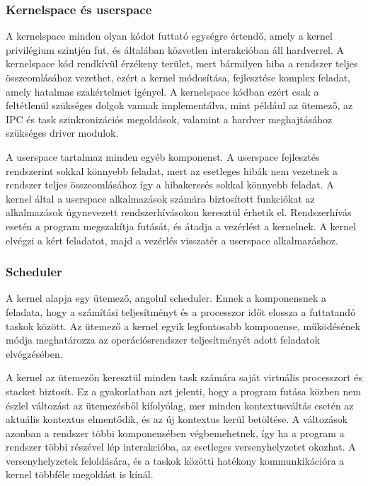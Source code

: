 \subsubsection{Kernelspace és userspace}

A kernelspace minden olyan kódot futtató egységre értendő, amely a
kernel privilégium szintjén fut, és általában közvetlen interakcióban áll
hardverrel. A kernelspace kód rendkívül érzékeny terület, mert bármilyen hiba a
rendszer teljes összeomlásához vezethet, ezért a kernel módosítása, fejlesztése
komplex feladat, amely hatalmas szakértelmet igényel. A kernelspace kódban ezért
csak a feltétlenül szükséges dolgok vannak implementálva, mint például az
ütemező, az IPC és task szinkronizációs megoldások, valamint a hardver
meghajtásához szükséges driver modulok. 

A userspace tartalmaz minden egyéb komponenst. A userspace fejlesztés rendszerint
sokkal könnyebb feladat, mert az esetleges hibák nem vezetnek a rendszer teljes
összeomlásához így a hibakeresés sokkal könnyebb feladat. A kernel által a
userspace alkalmazások számára biztosított funkciókat az alkalmazások
úgynevezett rendszerhívásokon keresztül érhetik el. Rendszerhívás esetén a
program megszakítja futását, és átadja a vezérlést a kernelnek. A kernel elvégzi
a kért feladatot, majd a vezérlés visszatér a userspace alkalmazáshoz.

\subsubsection{Scheduler}

A kernel alapja egy ütemező, angolul scheduler. Ennek a komponensnek a feladata,
hogy a számítási teljesítményt és a processzor időt elossza a futtatandó taskok
között. Az ütemező a kernel egyik legfontosabb komponense, működésének módja
meghatározza az operációsrendszer teljesítményét adott feladatok elvégzésében.

\medskip

A kernel az ütemezőn keresztül minden task számára saját virtuális processzort és
stacket biztosít. Ez a gyakorlatban azt jelenti, hogy a program futása közben nem
észlel változást az ütemezésből kifolyólag, mer minden kontextusváltás esetén az
aktuális kontextus elmentődik, és az új kontextus kerül betöltése. A változások
azonban a rendszer többi komponensében végbemehetnek, így ha a program a rendszer
többi részével lép interakcióba, az esetleges versenyhelyzetet okozhat. A
versenyhelyzetek feloldására, és a taskok közötti hatékony kommunkikációra a
kernel többféle megoldást is kínál. 


